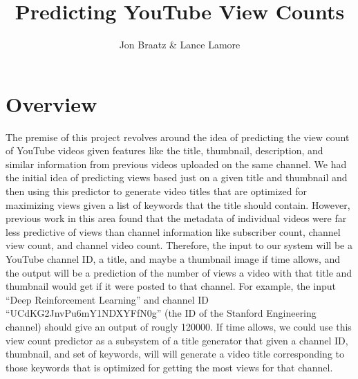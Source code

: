 \documentclass[12pt]{article}
\title{Predicting YouTube View Counts}
\author{Jon Braatz \& Lance Lamore}
\theoremstyle{definition}
\theoremstyle{remark}
\begin{document}
\maketitle


\section{Overview}

The premise of this project revolves around the idea of predicting the view
count of YouTube videos given features like the title, thumbnail, description,
and similar information from previous videos uploaded on the same channel. We
had the initial idea of predicting views based just on a given title and
thumbnail and then using this predictor to generate video titles that are
optimized for maximizing views given a list of keywords that the title should
contain. However, previous work in this area found that the metadata of
individual videos were far less predictive of views than channel information
like subscriber count, channel view count, and channel video count. Therefore,
the input to our system will be a YouTube channel ID, a title, and maybe a
thumbnail image if time allows, and the output will be a prediction of the number of
views a video with that title and thumbnail would get if it were posted to that
channel. For example, the input ``Deep Reinforcement Learning'' and channel ID
``UCdKG2JnvPu6mY1NDXYFfN0g'' (the ID of the Stanford Engineering channel) should give an output of rougly 120000. If time allows, we could use this view count predictor as a subsystem
of a title generator that given a channel ID, thumbnail, and set of keywords,
will will generate a video title corresponding to those keywords that is
optimized for getting the most views for that channel.
\end{document}
